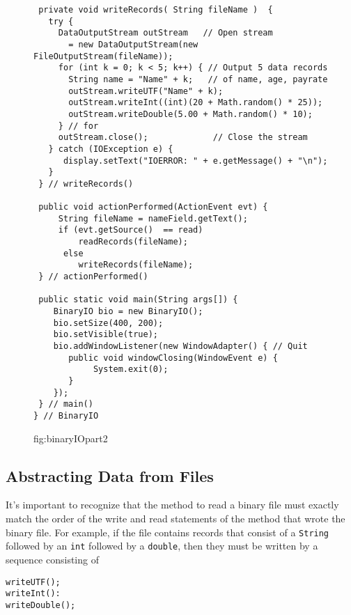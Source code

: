 \begin{figure}[tb]
\addtocounter{figure}{-1}
\jjjprogstart
\begin{jjjlisting}[28pc]
\begin{lstlisting}
 private void writeRecords( String fileName )  {
   try {
     DataOutputStream outStream   // Open stream
       = new DataOutputStream(new FileOutputStream(fileName)); 
     for (int k = 0; k < 5; k++) { // Output 5 data records
       String name = "Name" + k;   // of name, age, payrate
       outStream.writeUTF("Name" + k);    
       outStream.writeInt((int)(20 + Math.random() * 25));
       outStream.writeDouble(5.00 + Math.random() * 10);  
     } // for
     outStream.close();             // Close the stream
   } catch (IOException e) {
      display.setText("IOERROR: " + e.getMessage() + "\n");
   }
 } // writeRecords()

 public void actionPerformed(ActionEvent evt) {
     String fileName = nameField.getText();
     if (evt.getSource()  == read)
         readRecords(fileName);
      else
         writeRecords(fileName);
 } // actionPerformed()

 public static void main(String args[]) {
    BinaryIO bio = new BinaryIO();
    bio.setSize(400, 200);
    bio.setVisible(true);
    bio.addWindowListener(new WindowAdapter() { // Quit
       public void windowClosing(WindowEvent e) {
            System.exit(0);
       }
    });
 } // main()
} // BinaryIO
\end{lstlisting}
\end{jjjlisting}
{fig:binaryIOpart2}
\end{figure}

\subsection{Abstracting Data from Files}
\noindent It's important to recognize that the method to read a binary
file must exactly match the order of the write and read statements of
the method that wrote the binary file. For example, if the file contains
records that consist of a {\tt String} followed by an {\tt int}
followed by a {\tt double}, then they must be written by a sequence
consisting of

\begin{jjjlisting}
\begin{lstlisting}
writeUTF();
writeInt():
writeDouble();
\end{lstlisting}
\end{jjjlisting}

